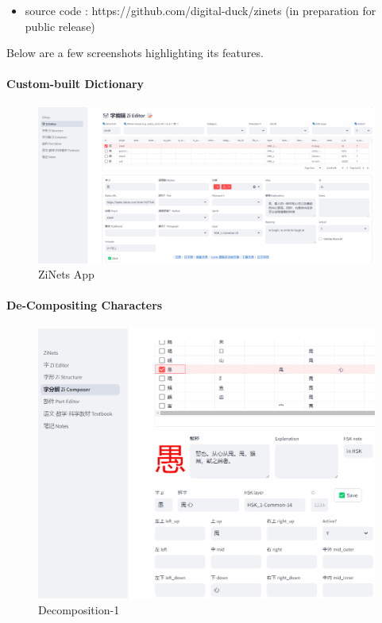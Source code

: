 \documentclass[
  11pt,
  letterpaper,
]{article}
\providecommand{\tightlist}{%
  \setlength{\itemsep}{0pt}\setlength{\parskip}{0pt}}
\begin{document}
\begin{itemize}
\tightlist
\item
  source code : https://github.com/digital-duck/zinets (in preparation
  for public release)
\end{itemize}

Below are a few screenshots highlighting its features.

\hypertarget{custom-built-dictionary}{%
\paragraph{Custom-built Dictionary}\label{custom-built-dictionary}}

\begin{figure}
\centering
\includegraphics{./images/app_zinets.png}
\caption{ZiNets App}
\end{figure}

\hypertarget{de-compositing-characters}{%
\paragraph{De-Compositing Characters}\label{de-compositing-characters}}

\begin{figure}
\centering
\includegraphics{./images/app_zi-parts-1.png}
\caption{Decomposition-1}
\end{figure}
\end{document}
